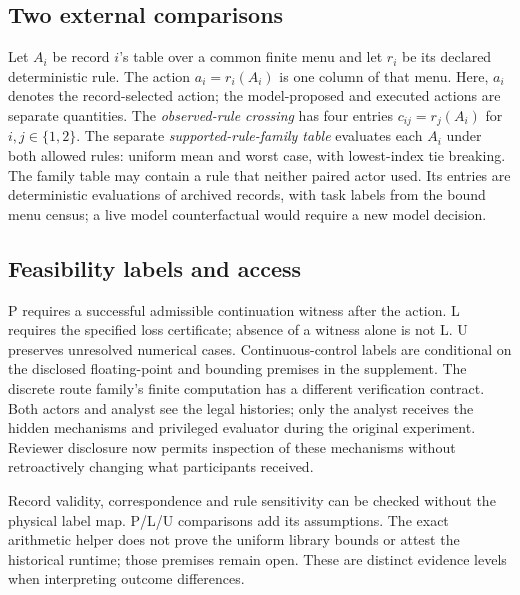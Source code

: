 \subsection{Two external comparisons}
Let $A_i$ be record $i$'s table over a common finite menu and let $r_i$
be its declared deterministic rule. The action $a_i=r_i(A_i)$ is one
column of that menu. Here, $a_i$ denotes the record-selected action; the
model-proposed and executed actions are separate quantities. The
\emph{observed-rule crossing} has four entries
$c_{ij}=r_j(A_i)$ for $i,j\in\{1,2\}$. The separate
\emph{supported-rule-family table} evaluates each $A_i$ under both allowed
rules: uniform mean and worst case, with lowest-index tie breaking.
The family table may contain a rule that neither paired actor used. Its
entries are deterministic evaluations of archived records, with task labels
from the bound menu census; a live model counterfactual would require a new
model decision.

\subsection{Feasibility labels and access}
P requires a successful admissible continuation witness after the action.
L requires the specified loss certificate; absence of a witness alone is not
L. U preserves unresolved numerical cases. Continuous-control labels are
conditional on the disclosed floating-point and bounding premises in the
supplement. The discrete route family's finite computation has a different
verification contract. Both actors and analyst see the legal histories; only
the analyst receives the hidden mechanisms and privileged evaluator during
the original experiment. Reviewer disclosure now permits inspection of these
mechanisms without retroactively changing what participants received.

Record validity, correspondence and rule sensitivity can be checked without
the physical label map. P/L/U comparisons add its assumptions. The exact
arithmetic helper does not prove the uniform library bounds or attest the
historical runtime; those premises remain open. These are distinct evidence
levels when interpreting outcome differences.

